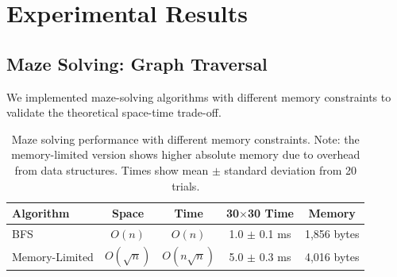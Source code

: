 \documentclass[11pt]{article}
\theoremstyle{definition}
\begin{document}
\section{Experimental Results}
\label{sec:experiments}

\subsection{Maze Solving: Graph Traversal}

We implemented maze-solving algorithms with different memory constraints to validate the theoretical space-time trade-off.

\begin{table}[ht]
\centering
\begin{tabular}{lcccc}
\toprule
Algorithm & Space & Time & 30$\times$30 Time & Memory \\
\midrule
BFS & $O(n)$ & $O(n)$ & 1.0 $\pm$ 0.1 ms & 1,856 bytes \\
Memory-Limited & $O(\sqrt{n})$ & $O(n\sqrt{n})$ & 5.0 $\pm$ 0.3 ms & 4,016 bytes \\
\bottomrule
\end{tabular}
\caption{Maze solving performance with different memory constraints. Note: the memory-limited version shows higher absolute memory due to overhead from data structures. Times show mean $\pm$ standard deviation from 20 trials.}
\label{tab:maze}
\end{table}
\end{document}
